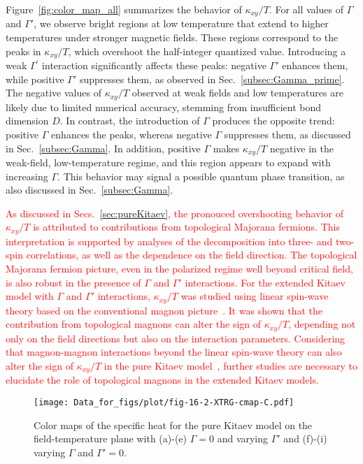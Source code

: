 \documentclass[twocolumn,superscriptaddress,showpacs, longbibliography, aps, prx]{revtex4-2}
\newcommand{\red}[1]{\textcolor{red}{#1}}
\begin{document}
Figure~\ref{fig:color_map_all} summarizes the behavior of $\kappa_{xy}/T$. 
For all values of $\Gamma$ and $\Gamma'$, we observe bright regions at low temperature that extend to higher temperatures under stronger magnetic fields. 
These regions correspond to the peaks in $\kappa_{xy}/T$, which overshoot the half-integer quantized value. 
Introducing a weak $\Gamma^{\prime}$ interaction significantly affects these peaks: 
negative $\Gamma'$ enhances them, while positive $\Gamma'$ suppresses them, as observed in Sec.~\ref{subsec:Gamma_prime}. 
The negative values of $\kappa_{xy}/T$ observed at weak fields and low temperatures are likely due to limited numerical accuracy, stemming from insufficient bond dimension $D$. 
In contrast, the introduction of $\Gamma$ produces the opposite trend:
positive $\Gamma$ enhances the peaks, whereas negative $\Gamma$ suppresses them, as discussed in Sec.~\ref{subsec:Gamma}.
In addition, positive $\Gamma$ makes $\kappa_{xy}/T$ negative in the weak-field, low-temperature regime, and this region appears to expand with increasing $\Gamma$. 
This behavior may signal a possible quantum phase transition, as also discussed in Sec.~\ref{subsec:Gamma}. 

\red{As discussed in Secs.~\ref{sec:pureKitaev}, the pronouced overshooting behavior of $\kappa_{xy}/T$ is attributed to contributions from topological Majorana fermions. 
This interpretation is supported by analyses of the decomposition into three- and two-spin correlations, as well as the dependence on the field direction. 
The topological Majorana fermion picture, even in the polarized regime well beyond critical field, is also robust in the presence of $\Gamma$ and $\Gamma'$ interactions. 
For the extended Kitaev model with $\Gamma$ and $\Gamma'$ interactions, $\kappa_{xy}/T$ was studied using linear spin-wave theory based on the conventional magnon picture~\cite{ChernZK2021,ZhangCK2021}. 
It was shown that the contribution from topological magnons can alter the sign of $\kappa_{xy}/T$, depending not only on the field directions but also on the interaction parameters. 
Considering that magnon-magnon interactions beyond the linear spin-wave theory can also alter the sign of $\kappa_{xy}/T$ in the pure Kitaev model~\cite{Koyama2024}, further studies are necessary to elucidate the role of topological magnons in the extended Kitaev models.}

\begin{figure*}[htb]
  \begin{center}
    \texttt{[image: Data\_for\_figs/plot/fig-16-2-XTRG-cmap-C.pdf]}
  \end{center}
  \caption{
Color maps of the specific heat for the pure Kitaev model on the field-temperature plane with (a)-(e) $\Gamma=0$ and varying $\Gamma'$ and  (f)-(i) varying $\Gamma$ and $\Gamma'=0$.}
  \label{fig:color_map_C}
\end{figure*}
\end{document}
